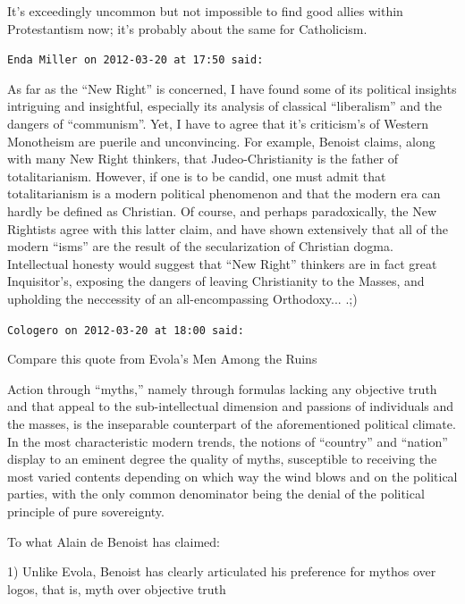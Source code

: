 \begin{footnotesize}
\begin{sffamily}
It's exceedingly uncommon but not impossible to find good allies within Protestantism now; it's probably about the same for Catholicism.

\hfill

\texttt{Enda Miller on 2012-03-20 at 17:50 said:}

As far as the ``New Right'' is concerned, I have found some of its political insights intriguing and insightful, especially its analysis of classical ``liberalism'' and the dangers of ``communism''. Yet, I have to agree that it's criticism's of Western Monotheism are puerile and unconvincing. For example, Benoist claims, along with many New Right thinkers, that Judeo-Christianity is the father of totalitarianism. However, if one is to be candid, one must admit that totalitarianism is a modern political phenomenon and that the modern era can hardly be defined as Christian. Of course, and perhaps paradoxically, the New Rightists agree with this latter claim, and have shown extensively that all of the modern ``isms'' are the result of the secularization of Christian dogma. Intellectual honesty would suggest that ``New Right'' thinkers are in fact great Inquisitor's, exposing the dangers of leaving Christianity to the Masses, and upholding the neccessity of an all-encompassing Orthodoxy... .;)

\hfill

\texttt{Cologero on 2012-03-20 at 18:00 said:}

Compare this quote from Evola's Men Among the Ruins

\begin{quotex}\footnotesize

Action through ``myths,'' namely through formulas lacking any objective truth and that appeal to the sub-intellectual dimension and passions of individuals and the masses, is the inseparable counterpart of the aforementioned political climate. In the most characteristic modern trends, the notions of ``country'' and ``nation'' display to an eminent degree the quality of myths, susceptible to receiving the most varied contents depending on which way the wind blows and on the political parties, with the only common denominator being the denial of the political principle of pure sovereignty.
\end{quotex}


To what Alain de Benoist has claimed:

1) Unlike Evola, Benoist has clearly articulated his preference for mythos over logos, that is, myth over objective truth


\end{sffamily}
\end{footnotesize}

